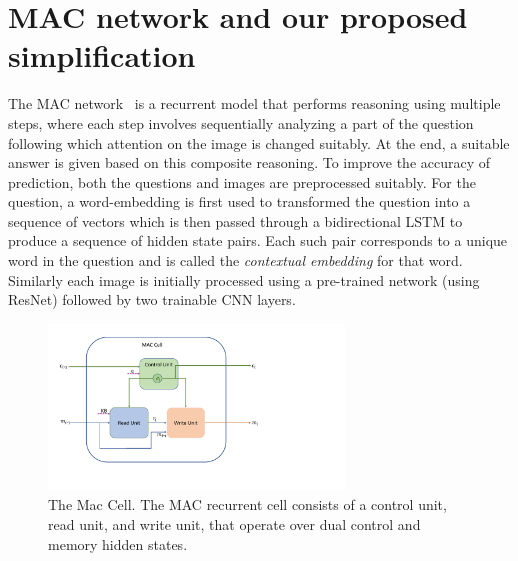 \section{MAC network and our proposed simplification}

The MAC network~\cite{hudsonManning18} is a recurrent model that performs reasoning 
using multiple steps, where each step involves sequentially analyzing a part of the question following which attention on the image is changed suitably.
At the end, a suitable answer is given based on this composite reasoning.
To improve the accuracy of prediction, both the questions and images
are preprocessed suitably. For the question,  a word-embedding is first used to
transformed the question into a sequence of vectors which is then passed through
a bidirectional LSTM to produce a sequence of hidden state pairs. Each such pair 
corresponds to a unique word in the question and is called the 
\emph{contextual embedding} for that word.
Similarly each image is initially processed using a pre-trained network (using ResNet) followed by two trainable CNN layers. 

\begin{figure}[htbp]
	\centering
	\includegraphics[width=0.7\textwidth]{img/mac_cell.pdf}
	\caption{The Mac Cell. The MAC recurrent cell consists of a control unit, read unit, and write unit, that operate over dual control and memory hidden states. }
	\label{fig:mac_cell}
\end{figure}

